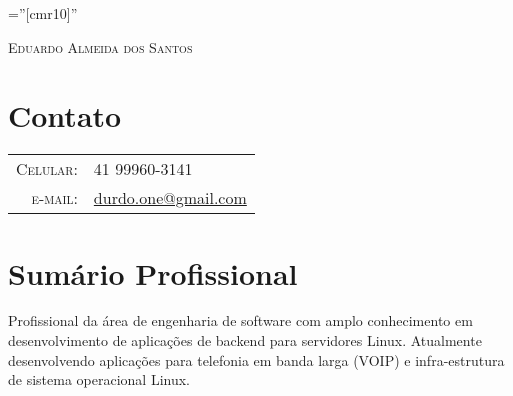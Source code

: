 \documentclass[a4paper,10pt]{article}
\begin{document}
\pagestyle{empty} %

\font\fb=''[cmr10]'' %


\par
{\centering
    {\Huge \textsc{Eduardo Almeida dos Santos}
}\bigskip\par}


\section{Contato}

\begin{tabular}{rl}


    \textsc{Celular:}
    & 41 99960-3141 \\

    \textsc{e-mail:}
    & \href{mailto:durdo.one@gmail.com}{durdo.one@gmail.com}
\end{tabular}


\section{Sumário Profissional}
    Profissional da área de engenharia de software com amplo conhecimento em
    desenvolvimento de aplicações de backend para servidores Linux. Atualmente
    desenvolvendo aplicações para telefonia em banda larga (VOIP) e
    infra-estrutura de sistema operacional Linux.

\end{document}
